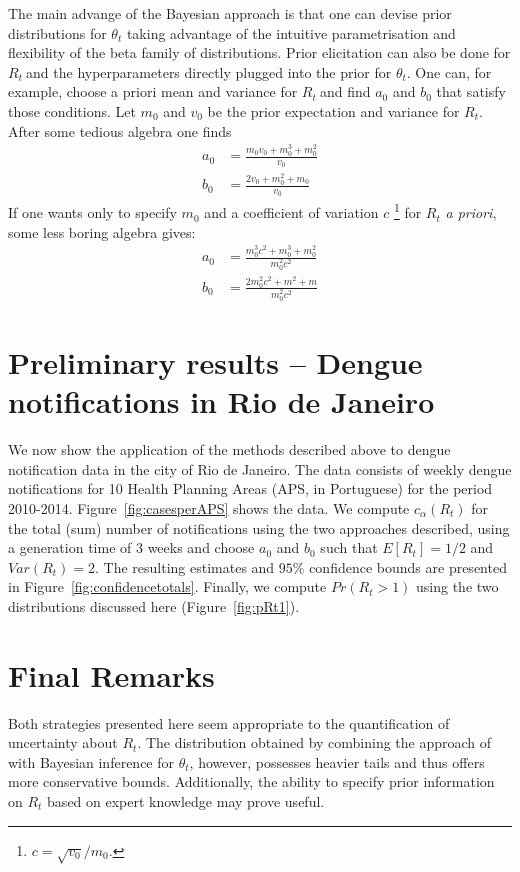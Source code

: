 \documentclass[12pt]{article}
\def \rr {$R_{t}\ $}
\begin{document}
The main advange of the Bayesian approach is that one can devise prior distributions for $\theta_t$ taking advantage of the intuitive parametrisation and flexibility of the beta family of distributions.
Prior elicitation can also be done for \rr and the hyperparameters directly plugged into the prior for $\theta_t$. 
One can, for example, choose a priori mean and variance for \rr and find $a_0$ and $b_0$ that satisfy those conditions.
Let $m_0$ and $v_0$ be the prior expectation and variance for $R_t$. 
After some tedious algebra one finds
\begin{align}
\label{eq:elicitation}
a_0 &= \frac{m_0v_0 + m_0^3 + m_0^2}{v_0} \\
b_0 &= \frac{2v_0 + m_0^2 + m_0}{v_0}
\end{align}
If one wants only to specify $m_0$ and a coefficient of variation $c$ \footnote{$c = \sqrt{v_0}/ m_0$.} for $R_t$ \textit{a priori}, some less boring algebra gives:
\begin{align}
\label{eq:elicitationcv}
a_0 &= \frac{m_0^3c^2 + m_0^3 + m_0^2}{m_0^2c^2} \\
b_0 &= \frac{2m_0^2c^2 + m^2 + m}{m_0^2c^2}
\end{align}

\newpage
\section{Preliminary results -- Dengue notifications in Rio de Janeiro}
\label{sec:dataanalysis}

We now show the application of the methods described above to dengue notification data in the city of Rio de Janeiro.
The data consists of weekly dengue notifications for 10 Health Planning Areas (APS, in Portuguese) for the period 2010-2014.
Figure~\ref{fig:casesperAPS} shows the data.
We compute $c_{\alpha}(R_t)$ for the total (sum) number of notifications using the two approaches described, using a generation time of $3$ weeks and choose $a_0$ and $b_0$ such that $E[R_t] = 1/2$ and $Var(R_t) = 2$.
The resulting estimates and $95\%$ confidence bounds are presented in Figure~\ref{fig:confidencetotals}.
Finally, we compute $Pr(R_t > 1)$ using the two distributions discussed here (Figure~\ref{fig:pRt1}).

\section{Final Remarks}
\label{sec:remarks}

Both strategies presented here seem appropriate to the quantification of uncertainty about $R_t$.
The distribution obtained by combining the approach of \citet{mantel} with Bayesian inference for $\theta_t$, however, possesses heavier tails and thus offers more conservative bounds.
Additionally, the ability to specify prior information on $R_t$ based on expert knowledge may prove useful.
\end{document}

